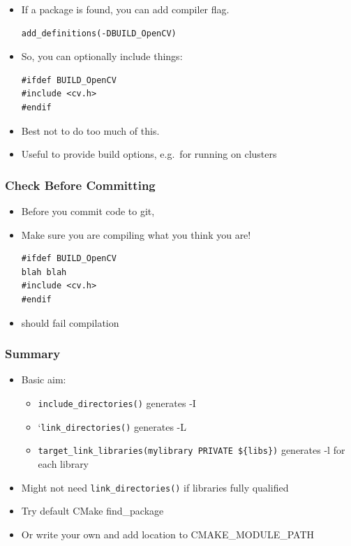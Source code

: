 \begin{itemize}
\item
  If a package is found, you can add compiler flag.

\begin{verbatim}
add_definitions(-DBUILD_OpenCV)
\end{verbatim}
\item
  So, you can optionally include things:

\begin{verbatim}
#ifdef BUILD_OpenCV
#include <cv.h>
#endif
\end{verbatim}
\item
  Best not to do too much of this.
\item
  Useful to provide build options, e.g.~for running on clusters
\end{itemize}

\subsubsection{Check Before Committing}\label{check-before-committing}

\begin{itemize}
\item
  Before you commit code to git,
\item
  Make sure you are compiling what you think you are!

\begin{verbatim}
#ifdef BUILD_OpenCV
blah blah
#include <cv.h>
#endif
\end{verbatim}
\item
  should fail compilation
\end{itemize}

\subsubsection{Summary}\label{summary-1}

\begin{itemize}
\itemsep1pt\parskip0pt
\item
  Basic aim:

  \begin{itemize}
  \itemsep1pt\parskip0pt
  \item
    \texttt{include\_directories()} generates -I
  \item
    `\texttt{link\_directories()} generates -L
  \item
    \texttt{target\_link\_libraries(mylibrary PRIVATE \$\{libs\})}
    generates -l for each library
  \end{itemize}
\item
  Might not need \texttt{link\_directories()} if libraries fully
  qualified
\item
  Try default CMake find\_package
\item
  Or write your own and add location to CMAKE\_MODULE\_PATH
\end{itemize}

